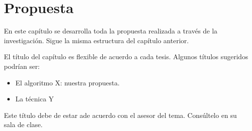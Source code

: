 \chapter{Propuesta}

En este capítulo se desarrolla toda la propuesta realizada a través de la investigación. Sigue la
misma estructura del capítulo anterior.

El título del capítulo es flexible de acuerdo a cada tesis. Algunos títulos sugeridos podrían ser:

\begin{itemize}
\item El algoritmo X: nuestra propuesta.
\item La técnica Y
\end{itemize}

Este título debe de estar ade acuerdo con el asesor del tema. Consúltelo en su sala de clase.